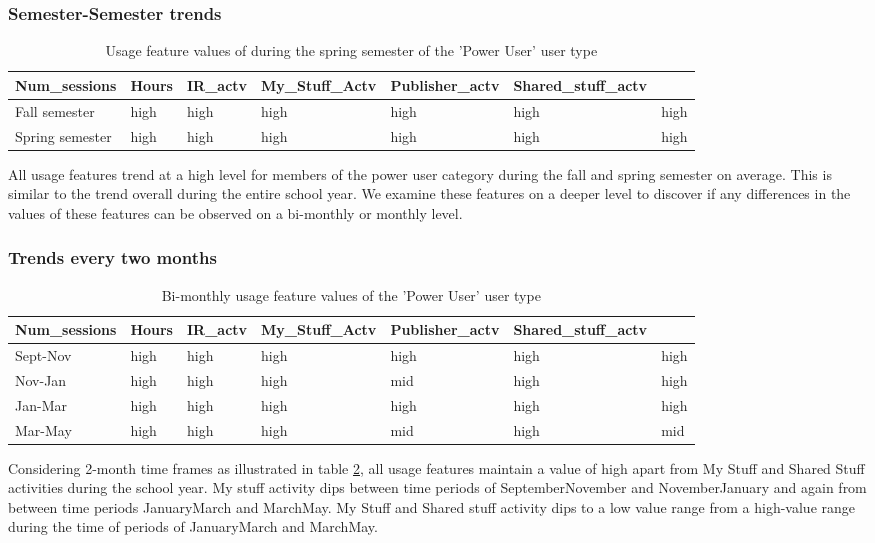 \documentclass{acm_proc_article-sp}
\begin{document}
\subsubsection{Semester-Semester trends}

\begin{table}
\caption{Usage feature values of during the spring semester of the 'Power User' user type}
\label{cluster1month}
\begin{tabular}{|p{}|p{1cm}|p{1cm}|p{1cm}|p{1cm}|p{1cm}|p{1cm}|}
 Num\_sessions & Hours & IR\_actv & My\_Stuff\_Actv & Publisher\_actv & Shared\_stuff\_actv \\ \hline
Fall  semester & high & high  & high & high & high & high \\ \hline
Spring semester & high & high  & high & high & high & high \\ \hline
\end{tabular}
\end{table}

All usage features trend at a high level for members of the power user category during the fall and spring semester on average. This is similar to the trend overall during the entire school year. We examine these features on a deeper level to discover if any differences in the values of these features can be observed on a bi-monthly or monthly level.

\subsubsection{Trends every two months}
\begin{table}
\caption{Bi-monthly usage feature values of the 'Power User' user type}
\label{cluster1bimonthly}
\begin{tabular}{|p{}|p{1cm}|p{1cm}|p{1cm}|p{1cm}|p{1cm}|p{1cm}|}
 Num\_sessions & Hours & IR\_actv & My\_Stuff\_Actv & Publisher\_actv & Shared\_stuff\_actv \\ \hline
Sept-Nov & high & high  & high & high & high & high \\ \hline
Nov-Jan & high & high  & high & mid & high & high \\ \hline
Jan-Mar & high & high  & high & high & high & high \\ \hline
Mar-May & high & high  & high & mid & high & mid \\ \hline
\end{tabular}
\end{table}

Considering 2-month time frames as illustrated in table \ref{cluster1bimonthly}, all usage features maintain a value of high apart from My Stuff and Shared Stuff activities during the school year. My stuff activity dips between time periods of September\-November and November\-January and again from between time periods January\-March and March\-May.
My Stuff and Shared stuff activity dips to a low value range from a high-value range during the time of periods of January\-March and March\-May.
\end{document}
